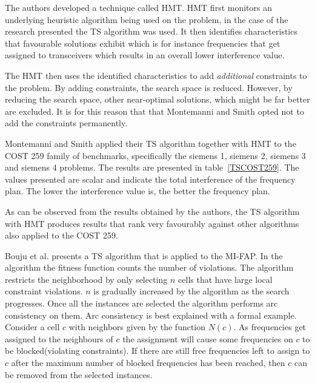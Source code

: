 The authors developed a technique called \gls{HMT}. \Gls{HMT} first monitors an underlying heuristic algorithm being used on the problem, in the case of the research presented the \gls{TS} algorithm was used\cite{TabuMontemanniSmith}. It then identifies characteristics that favourable solutions exhibit which is for instance frequencies that get assigned to transceivers which results in an overall lower interference value\cite{TabuMontemanniSmith}.

The \gls{HMT} then uses the identified characteristics to add \emph{additional} constraints to the problem\cite{TabuMontemanniSmith}. By adding constraints, the search space is reduced. However, by reducing the search space, other near-optimal solutions, which might be far better are excluded\cite{TabuMontemanniSmith}. It is for this reason that that Montemanni and Smith opted not to add the constraints permanently.

Montemanni and Smith applied their \gls{TS} algorithm together with \gls{HMT} to the \gls{COST} 259 family of benchmarks, specifically the siemens 1, siemens 2, siemens 3 and siemens 4 problems. The results are presented in table~\ref{TSCOST259}. The values presented are scalar and indicate the total interference of the frequency plan. The lower the interference value is, the better the frequency plan.

As can be observed from the results obtained by the authors, the \gls{TS} algorithm with HMT produces results that rank very favourably against other algorithms also applied to the \gls{COST} 259. 

Bouju et al. \cite{TSBouju} presents a TS algorithm that is applied to the MI-FAP. In the algorithm the fitness function counts the number of violations. The algorithm restricts the neighborhood by only selecting $n$ cells that have large local constraint violations. $n$ is gradually increased by the algorithm as the search progresses. Once all the instances are selected the algorithm performs arc consistency on them. Arc consistency is best explained with a formal example. Consider a cell $c$ with neighbors given by the function $N(c)$. As frequencies get assigned to the neighbours of $c$ the assignment will cause some frequencies on $c$ to be blocked(violating constraints). If there are still free frequencies left to assign to $c$ after the maximum number of blocked frequencies has been reached, then $c$ can be removed from the selected instances.

